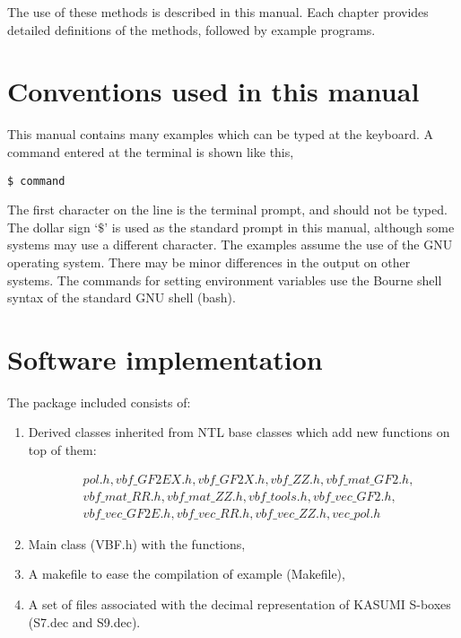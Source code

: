 The use of these methods is described in this manual. Each chapter provides detailed definitions of the methods, followed by example programs.

\section{Conventions used in this manual}\label{sec:Conventions}

This manual contains many examples which can be typed at the keyboard. A command entered at the terminal is shown like this,

\begin{verbatim}
$ command
\end{verbatim}

The first character on the line is the terminal prompt, and should not be typed. The dollar sign $‘\$’$ is used as the standard prompt in this manual, although some systems may use a different character.
The examples assume the use of the GNU operating system. There may be minor differences in the output on other systems. The commands for setting environment variables use the Bourne shell syntax of the standard GNU shell (bash).

\section{Software implementation}\label{sec:SW_implementation}

The package included consists of: 

\begin{enumerate}
\item Derived classes inherited from NTL base classes which add new functions on top of them:

\begin{equation}
\begin{array}{ll}
&pol.h, vbf\_GF2EX.h, vbf\_GF2X.h, vbf\_ZZ.h, vbf\_mat\_GF2.h, \\
& vbf\_mat\_RR.h, vbf\_mat\_ZZ.h, vbf\_tools.h, vbf\_vec\_GF2.h,\\ 
& vbf\_vec\_GF2E.h,  vbf\_vec\_RR.h, vbf\_vec\_ZZ.h, vec\_pol.h
\end{array}
\end{equation}

\item Main class (VBF.h) with the functions, 

\item A makefile to ease the compilation of example (Makefile),

\item A set of files associated with the decimal representation of KASUMI \cite{KASUMI:05} S-boxes (S7.dec and S9.dec).
\end{enumerate}

